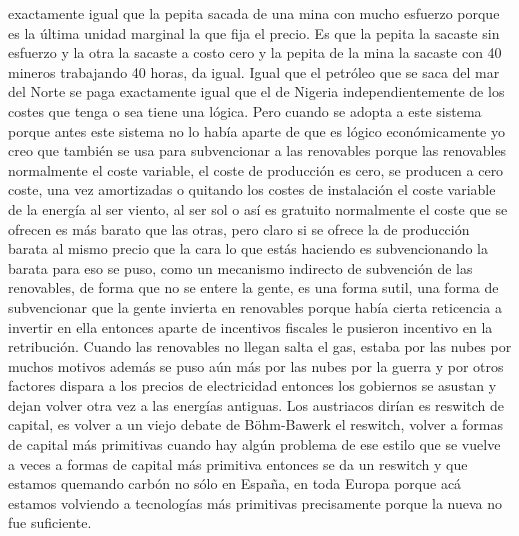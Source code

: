 exactamente igual que la pepita sacada de una mina con mucho esfuerzo porque es la última unidad marginal la que fija el precio. Es que la pepita la sacaste sin esfuerzo y la otra la sacaste a costo cero y la pepita de la mina la sacaste con 40 mineros trabajando 40 horas, da igual. Igual que el petróleo que se saca del mar del Norte se paga exactamente igual que el de Nigeria independientemente de los costes que tenga o sea tiene una lógica. Pero cuando se adopta a este sistema porque antes este sistema no lo había aparte de que es lógico económicamente yo creo que también se usa para subvencionar a las renovables porque las renovables normalmente el coste variable, el coste de producción es cero, se producen a cero coste, una vez amortizadas o quitando los costes de instalación el coste variable de la energía al ser viento, al ser sol o así es gratuito normalmente el coste que se ofrecen es más barato que las otras, pero claro si se ofrece la de producción barata al mismo precio que la cara lo que estás haciendo es subvencionando la barata para eso se puso, como un mecanismo indirecto de subvención de las renovables, de forma que no se entere la gente, es una forma sutil, una forma de subvencionar que la gente invierta en renovables porque había cierta reticencia a invertir en ella entonces aparte de incentivos fiscales le pusieron incentivo en la retribución. Cuando las renovables no llegan salta el gas, estaba por las nubes por muchos motivos además se puso aún más por las nubes por la guerra y por otros factores dispara a los precios de electricidad entonces los gobiernos se asustan y dejan volver otra vez a las energías antiguas. Los austriacos dirían es reswitch de capital, es volver a un viejo debate de Böhm-Bawerk el reswitch, volver a formas de capital más primitivas cuando hay algún problema de ese estilo que se vuelve a veces a formas de capital más primitiva entonces se da un reswitch y que estamos quemando carbón no sólo en España, en toda Europa porque acá estamos volviendo a tecnologías más primitivas precisamente porque la nueva no fue suficiente.

